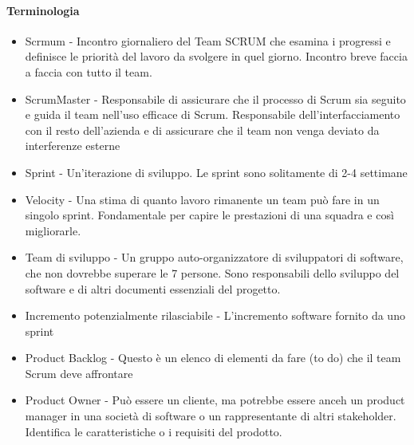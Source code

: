 \paragraph*{Terminologia}
\begin{itemize}
    \item Scrmum - Incontro giornaliero del Team SCRUM che esamina i progressi e definisce
    le priorità del lavoro da svolgere in quel giorno. Incontro breve faccia a faccia con tutto il team.
    \item ScrumMaster - Responsabile di assicurare che il processo di Scrum sia seguito e guida il team
    nell'uso efficace di Scrum. Responsabile dell'interfacciamento con il resto dell'azienda e di
    assicurare che il team non venga deviato da interferenze esterne
    \item Sprint - Un'iterazione di sviluppo. Le sprint sono solitamente di 2-4 settimane
    \item Velocity - Una stima di quanto lavoro rimanente un team può fare in un
    singolo sprint. Fondamentale per capire le prestazioni di una squadra e così
    migliorarle.
    \item Team di sviluppo - Un gruppo auto-organizzatore di sviluppatori di software,
    che non dovrebbe superare le 7 persone. Sono responsabili dello sviluppo del software e
    di altri documenti essenziali del progetto.
    \item Incremento potenzialmente rilasciabile - L'incremento software fornito da uno sprint
    \item Product Backlog - Questo è un elenco di elementi da fare (to do) che il team Scrum
    deve affrontare
    \item Product Owner - Può essere un cliente, ma potrebbe essere anceh un product manager
    in una società di software o un rappresentante di altri stakeholder. Identifica
    le caratteristiche o i requisiti del prodotto.
\end{itemize}

